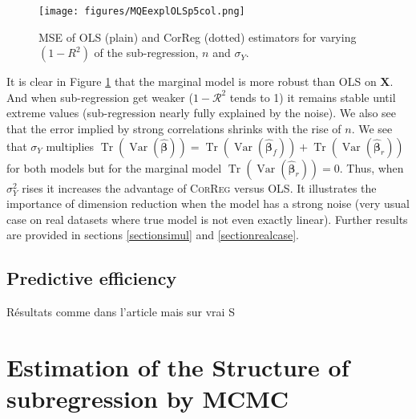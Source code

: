 \documentclass[12pt,a4paper]{report}
\begin{document}
\begin{figure}[h!]
	\texttt{[image: figures/MQEexplOLSp5col.png]}\label{MQE1}
	\caption{MSE of OLS (plain) and CorReg (dotted) estimators for varying $(1-R^2)$ of the sub-regression, $n$ and $\sigma_Y$.}
\end{figure} 
It is clear in Figure \ref{MQE1} that the marginal model is more robust than \textsc{OLS} on $\boldsymbol{X}$. And when sub-regression get weaker ($1-\mathcal{R}^2$ tends to 1) it remains stable until extreme values (sub-regression nearly fully explained by the noise). We also see that the error implied by strong correlations shrinks with the rise of $n$. 
We see that $\sigma_Y$ multiplies $\operatorname{Tr}(\operatorname{Var}(\hat{\boldsymbol{\beta}}))=\operatorname{Tr}(\operatorname{Var}(\hat{\boldsymbol{\beta}}_{f}))+\operatorname{Tr}(\operatorname{Var}(\hat{\boldsymbol{\beta}}_{r}))$ for both models but for the marginal model $\operatorname{Tr}(\operatorname{Var}(\hat{\boldsymbol{\beta}}_{r}))=0$.
 Thus, when $\sigma_Y^2$ rises it increases the advantage of \textsc{CorReg} versus \textsc{OLS}. It illustrates the importance of dimension reduction when the model has a strong noise (very usual case on real datasets where true model is not even exactly linear). Further results are provided in sections \ref{sectionsimul} and \ref{sectionrealcase}.

	\section{Predictive efficiency}
		Résultats comme dans l'article	mais sur vrai S	
		
\chapter{Estimation of the Structure of subregression by MCMC}
\end{document}
